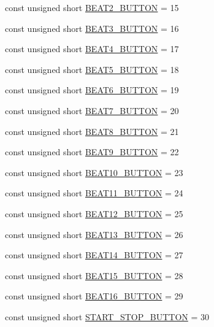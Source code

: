 \begin{DoxyCompactItemize}
\item 
const unsigned short \hyperlink{namespaceinputs_a8cdd33c9e53b617a2cf8bd32a5b74484}{B\+E\+A\+T2\+\_\+\+B\+U\+T\+T\+ON} = 15
\item 
const unsigned short \hyperlink{namespaceinputs_ab60a6fc2188a034f76d3fbe554efe314}{B\+E\+A\+T3\+\_\+\+B\+U\+T\+T\+ON} = 16
\item 
const unsigned short \hyperlink{namespaceinputs_af65f26f63a9572003a2bc49e7955e319}{B\+E\+A\+T4\+\_\+\+B\+U\+T\+T\+ON} = 17
\item 
const unsigned short \hyperlink{namespaceinputs_a8a027829529daa53a24ece7b8334164b}{B\+E\+A\+T5\+\_\+\+B\+U\+T\+T\+ON} = 18
\item 
const unsigned short \hyperlink{namespaceinputs_a6afdc23bce21454342081cf937e47ab9}{B\+E\+A\+T6\+\_\+\+B\+U\+T\+T\+ON} = 19
\item 
const unsigned short \hyperlink{namespaceinputs_ac74e302394a578b31f0cf44df8cbb1a9}{B\+E\+A\+T7\+\_\+\+B\+U\+T\+T\+ON} = 20
\item 
const unsigned short \hyperlink{namespaceinputs_abfcd4d28221c436391131a27402ea620}{B\+E\+A\+T8\+\_\+\+B\+U\+T\+T\+ON} = 21
\item 
const unsigned short \hyperlink{namespaceinputs_af628ea84bf7114a62249d4bb425ed06a}{B\+E\+A\+T9\+\_\+\+B\+U\+T\+T\+ON} = 22
\item 
const unsigned short \hyperlink{namespaceinputs_a9778bcf3a44a9d16ae156bac6d745a24}{B\+E\+A\+T10\+\_\+\+B\+U\+T\+T\+ON} = 23
\item 
const unsigned short \hyperlink{namespaceinputs_ad09e4010a8b08721988599b198645372}{B\+E\+A\+T11\+\_\+\+B\+U\+T\+T\+ON} = 24
\item 
const unsigned short \hyperlink{namespaceinputs_a7b6bb44b9241cac31ff9909c3fc88271}{B\+E\+A\+T12\+\_\+\+B\+U\+T\+T\+ON} = 25
\item 
const unsigned short \hyperlink{namespaceinputs_a8f9d547eaa8c52cebfa64221341f266a}{B\+E\+A\+T13\+\_\+\+B\+U\+T\+T\+ON} = 26
\item 
const unsigned short \hyperlink{namespaceinputs_a4dfd34a5656f72c71f1b2dd8efc963dc}{B\+E\+A\+T14\+\_\+\+B\+U\+T\+T\+ON} = 27
\item 
const unsigned short \hyperlink{namespaceinputs_a1952aa2d27b65c8d8899a1ae1cfb7bb9}{B\+E\+A\+T15\+\_\+\+B\+U\+T\+T\+ON} = 28
\item 
const unsigned short \hyperlink{namespaceinputs_af0f3099a06352ba4eb0808091b908178}{B\+E\+A\+T16\+\_\+\+B\+U\+T\+T\+ON} = 29
\item 
const unsigned short \hyperlink{namespaceinputs_ab1d04ae8b7a7f4d11849c110f20fae10}{S\+T\+A\+R\+T\+\_\+\+S\+T\+O\+P\+\_\+\+B\+U\+T\+T\+ON} = 30
\end{DoxyCompactItemize}


